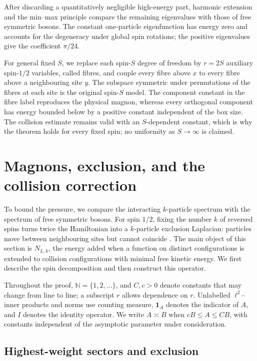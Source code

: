 \documentclass[11pt]{article}
\numberwithin{equation}{section}
\theoremstyle{remark}
\newcommand{\N}{\mathbb N}
\newcommand{\1}{\mathbf 1}
\begin{document}
After discarding a quantitatively negligible high-energy part, harmonic
extension and the min--max principle compare the remaining eigenvalues
with those of free symmetric bosons.  The constant one-particle
eigenfunction has energy zero and accounts for the degeneracy under global
spin rotations; the positive eigenvalues give the coefficient \(\pi/24\).

For general fixed \(S\), we replace each spin-\(S\) degree of freedom by
\(r=2S\) auxiliary spin-\(1/2\) variables, called fibres, and couple every
fibre above \(x\) to every fibre above a neighbouring site \(y\).  The
subspace symmetric under permutations of the fibres at each site is the
original spin-\(S\) model.  The component constant in the fibre label
reproduces the physical magnon, whereas every orthogonal component has
energy bounded below by a positive constant independent of the box size.
The collision estimate remains valid with an \(S\)-dependent constant,
which is why the theorem holds for every fixed spin; no uniformity as
\(S\to\infty\) is claimed.

\section{Magnons, exclusion, and the collision correction}
\label{sec:magnons-collision}

To bound the pressure, we compare the interacting \(k\)-particle spectrum
with the spectrum of free symmetric bosons.  For spin \(1/2\), fixing the
number \(k\) of reversed spins turns twice the Hamiltonian into a
\(k\)-particle exclusion Laplacian: particles move between neighbouring
sites but cannot coincide \cite{Thomas1980}.  The main object of this
section is \(N_{L,k}\), the energy added when a function on distinct
configurations is extended to collision configurations with minimal free
kinetic energy.  We first describe the spin decomposition and then
construct this operator.

Throughout the proof, \(\N=\{1,2,\ldots\}\), and \(C,c>0\) denote
constants that may change from line to line; a subscript \(r\) allows
dependence on \(r\).  Unlabelled \(\ell^2\)-inner products and norms use
counting measure, \(\1_A\) denotes the indicator of \(A\), and \(I\) denotes
the identity operator.  We write \(A\asymp B\) when
\(cB\leq A\leq CB\), with constants independent of the asymptotic
parameter under consideration.

\subsection{Highest-weight sectors and exclusion}
\label{subsec:highest-weight}
\end{document}
